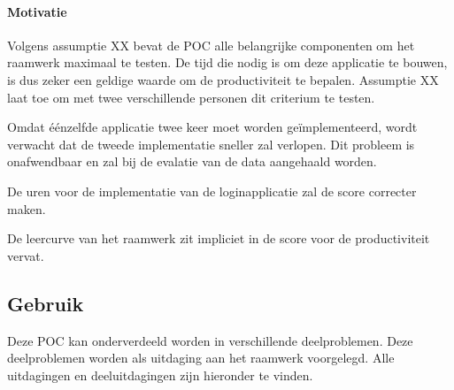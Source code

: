 % 

\paragraph{Motivatie}

Volgens assumptie XX bevat de POC alle belangrijke componenten om het raamwerk maximaal te testen.
De tijd die nodig is om deze applicatie te bouwen, is dus zeker een geldige waarde om de productiviteit te bepalen.
Assumptie XX laat toe om met twee verschillende personen dit criterium te testen.

Omdat éénzelfde applicatie twee keer moet worden geïmplementeerd, wordt verwacht dat de tweede implementatie sneller zal verlopen.
Dit probleem is onafwendbaar en zal bij de evalatie van de data aangehaald worden.

De uren voor de implementatie van de loginapplicatie zal de score correcter maken.

De leercurve van het raamwerk zit impliciet in de score voor de productiviteit vervat.


\subsection{Gebruik}
\label{sec:vergelijking-gebruik}

Deze POC kan onderverdeeld worden in verschillende deelproblemen.
Deze deelproblemen worden als uitdaging aan het raamwerk voorgelegd.
Alle uitdagingen en deeluitdagingen zijn hieronder te vinden.

{}

